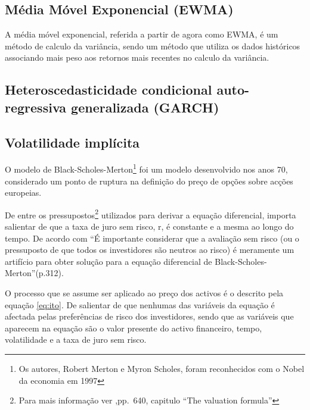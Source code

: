 \documentclass[
  12pt,
  a4paper,
  openany]{book}
\begin{document}
\hypertarget{muxe9dia-muxf3vel-exponencial-ewma}{%
\subsection{Média Móvel Exponencial (EWMA)}\label{muxe9dia-muxf3vel-exponencial-ewma}}

A média móvel exponencial, referida a partir de agora como EWMA, é um método de calculo da variância, sendo um método que utiliza os dados históricos associando mais peso aos retornos mais recentes no calculo da variância.

\hypertarget{heteroscedasticidade-condicional-auto-regressiva-generalizada-garch}{%
\subsection{Heteroscedasticidade condicional auto-regressiva generalizada (GARCH)}\label{heteroscedasticidade-condicional-auto-regressiva-generalizada-garch}}

\hypertarget{volatilidade-impluxedcita}{%
\subsection{Volatilidade implícita}\label{volatilidade-impluxedcita}}

O modelo de Black-Scholes-Merton\footnote{Os autores, Robert Merton e Myron Scholes, foram reconhecidos com o Nobel da economia em 1997} foi um modelo desenvolvido nos anos 70, considerado um ponto de ruptura na definição do preço de opções sobre acções europeias.

De entre os pressupostos\footnote{Para mais informação ver \citet{BlackScholes},pp.~640, capitulo ``The valuation formula''} utilizados para derivar a equação diferencial, importa salientar de que a taxa de juro sem risco, r, é constante e a mesma ao longo do tempo. De acordo com \citet{Hull2018} ``É importante considerar que a avaliação sem risco (ou o pressuposto de que todos os investidores são neutros ao risco) é meramente um artifício para obter solução para a equação diferencial de Black-Scholes-Merton''(p.312).

O processo que se assume ser aplicado ao preço dos activos é o descrito pela equação \eqref{eq:ito}. De salientar de que nenhumas das variáveis da equação é afectada pelas preferências de risco dos investidores, sendo que as variáveis que aparecem na equação são o valor presente do activo financeiro, tempo, volatilidade e a taxa de juro sem risco.
\end{document}
